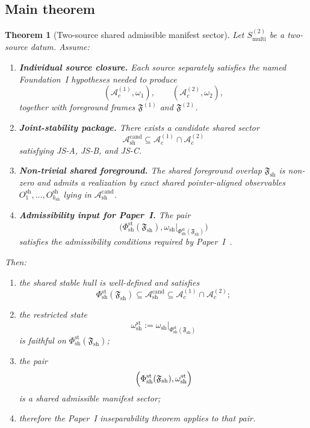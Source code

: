 \documentclass[12pt]{article}
\newtheorem{theorem}{Theorem}[section]
\theoremstyle{definition}
\theoremstyle{remark}
\begin{document}
\subsection{Main theorem}

\begin{theorem}[Two-source shared admissible manifest sector]
\label{thm:main}
Let \(S_{\mathrm{multi}}^{(2)}\) be a two-source datum. Assume:
\begin{enumerate}
\item \textbf{Individual source closure.} Each source separately
  satisfies the named Foundation~I hypotheses needed to produce
  \[
  (\mathcal A_c^{(1)},\omega_1),
  \qquad
  (\mathcal A_c^{(2)},\omega_2),
  \]
  together with foreground frames
  \(\mathfrak F^{(1)}\) and \(\mathfrak F^{(2)}\).
\item \textbf{Joint-stability package.} There exists a candidate shared
  sector
  \[
  \mathcal A_{\mathrm{sh}}^{\mathrm{cand}}
  \subseteq
  \mathcal A_c^{(1)}\cap\mathcal A_c^{(2)}
  \]
  satisfying JS-A, JS-B, and JS-C.
\item \textbf{Non-trivial shared foreground.} The shared foreground
  overlap \(\mathfrak F_{\mathrm{sh}}\) is non-zero and admits a
  realization by exact shared pointer-aligned observables
  \(O_1^{\mathrm{sh}},\dots,O_{k_{\mathrm{sh}}}^{\mathrm{sh}}\) lying in
  \(\mathcal A_{\mathrm{sh}}^{\mathrm{cand}}\).
\item \textbf{Admissibility input for Paper~I.} The pair
  \[
  \bigl(
  \Phi_{\mathrm{sh}}^{\mathrm{st}}(\mathfrak F_{\mathrm{sh}}),
  \omega_{\mathrm{sh}}|_{\Phi_{\mathrm{sh}}^{\mathrm{st}}(\mathfrak F_{\mathrm{sh}})}
  \bigr)
  \]
  satisfies the admissibility conditions required by
  Paper~I~\cite{PaperI}.
\end{enumerate}
Then:
\begin{enumerate}
\item the shared stable hull is well-defined and satisfies
  \[
  \Phi_{\mathrm{sh}}^{\mathrm{st}}(\mathfrak F_{\mathrm{sh}})
  \subseteq
  \mathcal A_{\mathrm{sh}}^{\mathrm{cand}}
  \subseteq
  \mathcal A_c^{(1)}\cap \mathcal A_c^{(2)};
  \]
\item the restricted state
  \[
  \omega_{\mathrm{sh}}^{\mathrm{st}}
  :=
  \omega_{\mathrm{sh}}|_{\Phi_{\mathrm{sh}}^{\mathrm{st}}(\mathfrak F_{\mathrm{sh}})}
  \]
  is faithful on
  \(\Phi_{\mathrm{sh}}^{\mathrm{st}}(\mathfrak F_{\mathrm{sh}})\);
\item the pair
  \[
  \Bigl(
  \Phi_{\mathrm{sh}}^{\mathrm{st}}(\mathfrak F_{\mathrm{sh}}),
  \omega_{\mathrm{sh}}^{\mathrm{st}}
  \Bigr)
  \]
  is a shared admissible manifest sector;
\item therefore the Paper~I inseparability theorem applies to that pair.
\end{enumerate}
\end{theorem}
\end{document}
